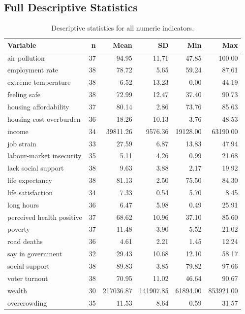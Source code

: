\documentclass[11pt,a4paper]{article}
\begin{document}
\subsection{Full Descriptive Statistics}

\begin{table}[H]
\centering
\small
\caption{Descriptive statistics for all numeric indicators.}
\begin{tabular}{lrrrrr}
\toprule
Variable & n & Mean & SD & Min & Max \\
\midrule
air pollution & 37 & 94.95 & 11.71 & 47.85 & 100.00 \\
employment rate & 38 & 78.72 & 5.65 & 59.24 & 87.61 \\
extreme temperature & 38 & 6.52 & 13.23 & 0.00 & 44.19 \\
feeling safe & 38 & 72.99 & 12.47 & 37.40 & 90.73 \\
housing affordability & 37 & 80.14 & 2.86 & 73.76 & 85.63 \\
housing cost overburden & 36 & 18.26 & 10.13 & 3.76 & 48.53 \\
income & 34 & 39811.26 & 9576.36 & 19128.00 & 63190.00 \\
job strain & 33 & 27.59 & 6.87 & 13.83 & 47.94 \\
labour-market insecurity & 35 & 5.11 & 4.26 & 0.99 & 21.68 \\
lack social support & 38 & 9.63 & 3.88 & 2.17 & 19.92 \\
life expectancy & 38 & 81.13 & 2.50 & 75.50 & 84.30 \\
life satisfaction & 34 & 7.33 & 0.54 & 5.70 & 8.45 \\
long hours & 36 & 6.47 & 5.98 & 0.49 & 25.91 \\
perceived health positive & 37 & 68.62 & 10.96 & 37.10 & 85.60 \\
poverty & 37 & 11.48 & 3.90 & 5.52 & 21.02 \\
road deaths & 36 & 4.61 & 2.21 & 1.45 & 12.24 \\
say in government & 32 & 29.43 & 10.68 & 12.10 & 58.17 \\
social support & 38 & 89.83 & 3.85 & 79.82 & 97.66 \\
voter turnout & 38 & 70.95 & 11.02 & 46.64 & 90.67 \\
wealth & 30 & 217036.87 & 141907.85 & 61894.00 & 853921.00 \\
overcrowding & 35 & 11.53 & 8.64 & 0.59 & 31.57 \\
\bottomrule
\end{tabular}
\end{table}
\end{document}
